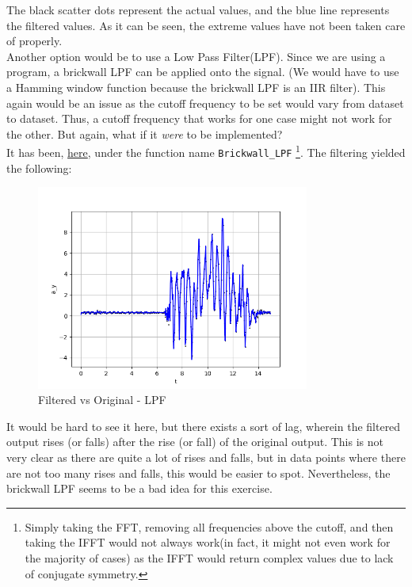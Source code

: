 \documentclass[oneside]{book}
\begin{document}
The black scatter dots represent the actual values, and the blue line represents the filtered values. As it can be seen, the extreme values have not been taken care of properly.  \\
\bigskip
Another option would be to use a Low Pass Filter(LPF). Since we are using a program, a brickwall LPF can be applied onto the signal. (We would have to use a Hamming window function because the brickwall LPF is an IIR filter). This again would be an issue as the cutoff frequency to be set would vary from dataset to dataset. Thus, a cutoff frequency that works for one case might not work for the other. But again, what if it \textit{were} to be implemented?\\
It has been, \href{https://github.com/HarryNyquist/Odometry/blob/main/Odomtery_Bad_Tries/Bad_Filter_attempts.py}{here}, under the function name \verb|Brickwall_LPF| \footnote{Simply taking the FFT, removing all frequencies above the cutoff, and then taking the IFFT would not always work(in fact, it might not even work for the majority of cases) as the IFFT would return complex values due to lack of conjugate symmetry.}. The filtering yielded the following:
\begin{figure}[htbp]
    \centering
    \includegraphics[width=0.8\textwidth]{figs/Filtered_using_brickwall_LPF.png}
    \caption{Filtered vs Original - LPF}
\end{figure}
It would be hard to see it here, but there exists a sort of lag, wherein the filtered output rises (or falls) after the rise (or fall) of the original output. This is not very clear as there are quite a lot of rises and falls, but in data points where there are not too many rises and falls, this would be easier to spot. Nevertheless, the brickwall LPF seems to be a bad idea for this exercise.\\
\end{document}
